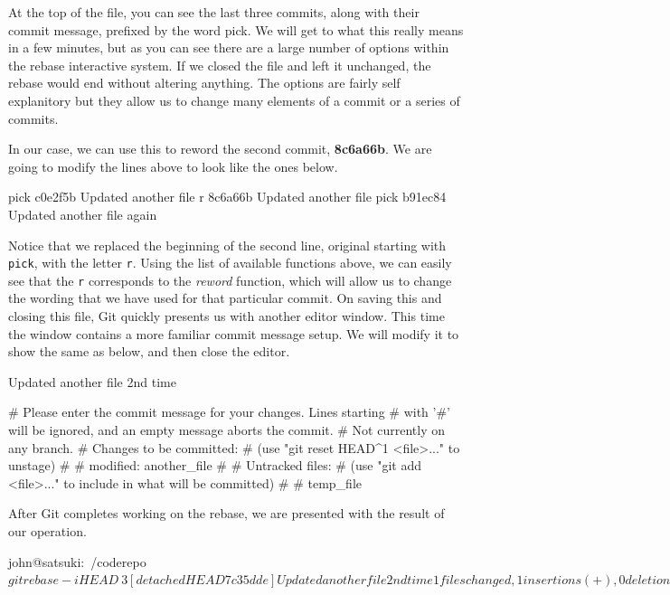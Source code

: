 At the top of the file, you can see the last three commits, along with their commit message, prefixed by the word pick.
We will get to what this really means in a few minutes, but as you can see there are a large number of options within the rebase interactive system.
If we closed the file and left it unchanged, the rebase would end without altering anything.
The options are fairly self explanitory but they allow us to change many elements of a commit or a series of commits.

In our case, we can use this to reword the second commit, \textbf{8c6a66b}.
We are going to modify the lines above to look like the ones below.

\begin{code}
pick c0e2f5b Updated another file
r 8c6a66b Updated another file
pick b91ec84 Updated another file again
\end{code}

Notice that we replaced the beginning of the second line, original starting with \texttt{pick}, with the letter \texttt{r}.
Using the list of available functions above, we can easily see that the \texttt{r} corresponds to the \emph{reword} function, which will allow us to change the wording that we have used for that particular commit.
On saving this and closing this file, Git quickly presents us with another editor window.
This time the window contains a more familiar commit message setup.
We will modify it to show the same as below, and then close the editor.

\begin{code}
Updated another file 2nd time

# Please enter the commit message for your changes. Lines starting
# with '#' will be ignored, and an empty message aborts the commit.
# Not currently on any branch.
# Changes to be committed:
#   (use "git reset HEAD^1 <file>..." to unstage)
#
#       modified:   another_file
#
# Untracked files:
#   (use "git add <file>..." to include in what will be committed)
#
#       temp_file
\end{code}

After Git completes working on the rebase, we are presented with the result of our operation.

\begin{code}
john@satsuki:~/coderepo$ git rebase -i HEAD~3
[detached HEAD 7c35dde] Updated another file 2nd time
 1 files changed, 1 insertions(+), 0 deletions(-)
Successfully rebased and updated refs/heads/wonderful.
john@satsuki:~/coderepo$
\end{code}

